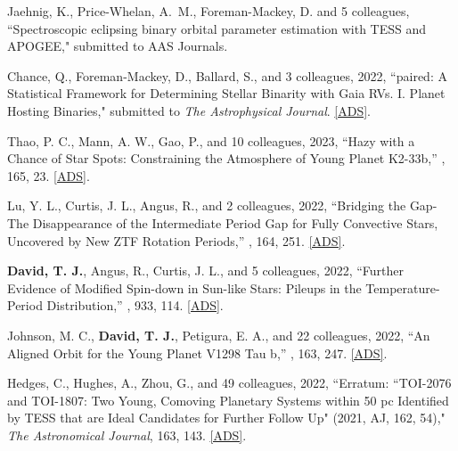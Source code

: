 
\item {Jaehnig, K.}, {Price-Whelan, A.~M.}, {Foreman-Mackey, D.} and 5 colleagues, ``{Spectroscopic eclipsing binary orbital parameter estimation with TESS and APOGEE}," submitted to AAS Journals.

\item {{Chance}, Q., {Foreman-Mackey}, D.,  {Ballard}, S., and 3 colleagues}, 2022, ``{paired: A Statistical Framework for Determining Stellar Binarity with Gaia RVs. I. Planet Hosting Binaries}," submitted to \textit{The Astrophysical Journal}. \href{https://ui.adsabs.harvard.edu/abs/2022arXiv220611275C/abstract}{[ADS]}.


\item {{Thao}, P. C.}, {{Mann}, A. W.}, {{Gao}, P.}, and 10 colleagues, 2023, ``{Hazy with a Chance of Star Spots: Constraining the Atmosphere of Young Planet K2-33b},'' \textit{\aj}, 165, 23. \href{https://ui.adsabs.harvard.edu/abs/2023AJ....165...23T}{[ADS]}.

\item {{Lu}, Y. L.}, {{Curtis}, J. L.}, {{Angus}, R.}, and 2 colleagues, 2022, ``{Bridging the Gap-The Disappearance of the Intermediate Period Gap for Fully Convective Stars, Uncovered by New ZTF Rotation Periods},'' \textit{\aj}, 164, 251. \href{https://ui.adsabs.harvard.edu/abs/2022AJ....164..251L}{[ADS]}.

\item {{\bf{David}, T. J.}}, {{Angus}, R.}, {{Curtis}, J. L.}, and 5 colleagues, 2022, ``{Further Evidence of Modified Spin-down in Sun-like Stars: Pileups in the Temperature-Period Distribution},'' \textit{\apj}, 933, 114. \href{https://ui.adsabs.harvard.edu/abs/2022ApJ...933..114D}{[ADS]}.

\item {{Johnson}, M. C.}, {{\bf{David}, T. J.}}, {{Petigura}, E. A.}, and 22 colleagues, 2022, ``{An Aligned Orbit for the Young Planet V1298 Tau b},'' \textit{\aj}, 163, 247. \href{https://ui.adsabs.harvard.edu/abs/2022AJ....163..247J}{[ADS]}.

\item {{Hedges}, C., {Hughes}, A., {Zhou}, G., and 49 colleagues}, 2022, ``{Erratum: ``TOI-2076 and TOI-1807: Two Young, Comoving Planetary Systems within 50 pc Identified by TESS that are Ideal Candidates for Further Follow Up" (2021, AJ, 162, 54)}," \textit{The Astronomical Journal}, 163, 143. \href{https://ui.adsabs.harvard.edu/abs/2022AJ....163..143H/abstract}{[ADS]}.

